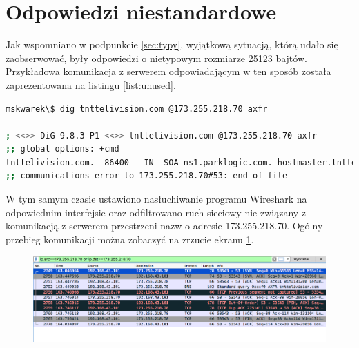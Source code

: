 \section{Odpowiedzi niestandardowe}
\noindent Jak wspomniano w podpunkcie \ref{sec:typy}, wyjątkową sytuacją, którą udało się zaobserwować, były odpowiedzi o nietypowym
rozmiarze 25123 bajtów. Przykładowa komunikacja z serwerem odpowiadającym w ten sposób została zaprezentowana na listingu
\ref{list:unused}.

\begin{lstlisting}[label={list:unused},captionpos=b,caption=Przykładowy odpowiedź serwera.,language=bash]
mskwarek\$ dig tnttelivision.com @173.255.218.70 axfr

; <<>> DiG 9.8.3-P1 <<>> tnttelivision.com @173.255.218.70 axfr
;; global options: +cmd
tnttelivision.com.	86400	IN	SOA	ns1.parklogic.com. hostmaster.tnttelivision.com. 2017061500 16384 2048 1048576 2560
;; communications error to 173.255.218.70#53: end of file
\end{lstlisting}

W tym samym czasie ustawiono nasłuchiwanie programu Wireshark \cite{wireshark} na odpowiednim interfejsie oraz odfiltrowano ruch sieciowy
nie związany z komunikacją z serwerem przestrzeni nazw o adresie 173.255.218.70. Ogólny przebieg komunikacji można zobaczyć na
zrzucie ekranu \ref{fig:unused_wireshark}.
\begin{figure}[h!]
\centering
\includegraphics[width=1.0\textwidth]{image/unused_wireshark}
	\caption{}
\label{fig:unused_wireshark}
\end{figure}

